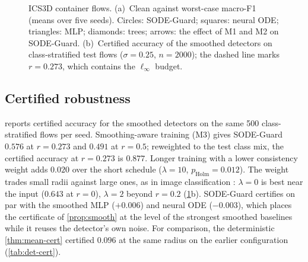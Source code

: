 \documentclass{article}
\theoremstyle{definition}
\begin{document}
\begin{figure}[t]
\caption{ICS3D container flows. (a)~Clean against worst-case macro-F1 (means over five seeds).
Circles: SODE-Guard; squares: neural ODE; triangles: MLP; diamonds: trees;
arrows: the effect of M1 and M2 on SODE-Guard. (b)~Certified accuracy of the
smoothed detectors on class-stratified test flows ($\sigma=0.25$, $n=2000$);
the dashed line marks $r=0.273$, which contains the $\ell_\infty$ budget.}
\label{fig:results}
\end{figure}

\subsection{Certified robustness}
 reports certified accuracy for the smoothed detectors on the same
500 class-stratified flows per seed. Smoothing-aware training (M3) gives
SODE-Guard $0.576$ at $r=0.273$ and $0.491$ at $r=0.5$; reweighted to the test
class mix, the certified accuracy at $r=0.273$ is $0.877$. Longer training with a
lower consistency weight adds $0.020$ over the short schedule ($\lambda=10$,
$p_{\mathrm{Holm}}=0.012$). The
weight trades small radii against large ones, as in image classification
\citep{jeong2020consistency}: $\lambda=0$ is best near the input ($0.643$ at
$r=0$), $\lambda=2$ beyond $r=0.2$ (\cref{fig:results}b). SODE-Guard certifies
on par with the smoothed MLP ($+0.006$) and neural ODE ($-0.003$), which places
the certificate of \cref{prop:smooth} at the level of the strongest smoothed
baselines while it reuses the detector's own noise. For comparison, the
deterministic \cref{thm:mean-cert} certified $0.096$ at the same radius on the
earlier configuration (\cref{tab:det-cert}).
\end{document}
